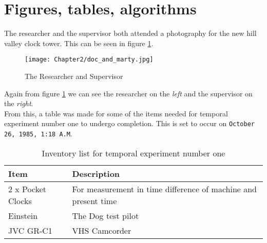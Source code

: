 \section{Figures, tables, algorithms}
\label{sec: figs tables algos}

The researcher and the supervisor both attended a photography for the new hill valley clock tower. This can be seen in figure \ref{fig:clock tower photo}.

\begin{figure}[h!]
    \centering
    \texttt{[image: Chapter2/doc\_and\_marty.jpg]}
    \caption{The Researcher and Supervisor}
    \label{fig:clock tower photo}
\end{figure}

\noindent Again from figure \ref{fig:clock tower photo} we can see the researcher on the \textit{left} and the supervisor on the \textit{right}.\\

From this, a table was made for some of the items needed for temporal experiment number one to undergo completion. This is set to occur on \texttt{October 26, 1985, 1:18 A.M}.

\begin{table}[H] 
\begin{tabularx}{\textwidth}{| X | X |}
    \hline
     Item & Description  \\ \hline
     2 x Pocket Clocks & For measurement in time difference of machine and present time \\ \hline
     Einstein & The Dog test pilot \\ \hline
     JVC GR-C1 & VHS Camcorder \\ \hline
\end{tabularx}
\caption{Inventory list for temporal experiment number one}
\label{table: inventory}
\end{table}

